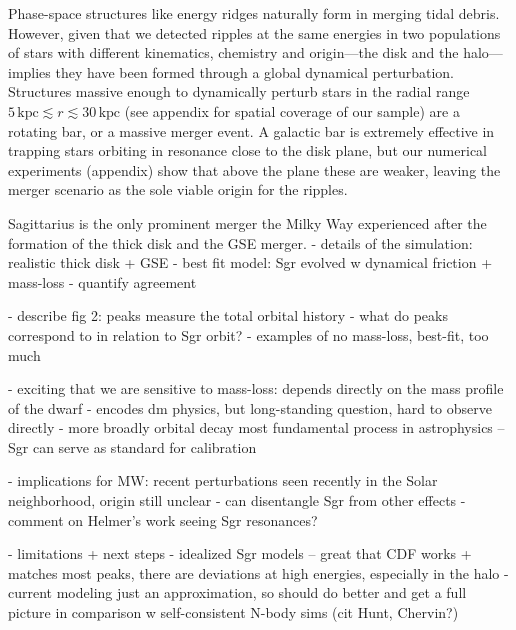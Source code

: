 \documentclass{natureprintstyle}
\newcommand{\kpc}{\ensuremath{\textrm{kpc}}}
\begin{document}
Phase-space structures like energy ridges naturally form in merging tidal debris\cite{gomez:2010, gomez:2012a, belokurov:2023}.
However, given that we detected ripples at the same energies in two populations of stars with different kinematics, chemistry and origin---the disk and the halo---implies they have been formed through a global dynamical perturbation.
Structures massive enough to dynamically perturb stars in the radial range $5\,\kpc\lesssim r \lesssim 30\,\kpc$ (see appendix for spatial coverage of our sample) are a rotating bar, or a massive merger event.
A galactic bar is extremely effective in trapping stars orbiting in resonance close to the disk plane\cite{dehnen:2000, trick:2021, dilamore:2023}, but our numerical experiments (appendix) show that above the plane these are weaker, leaving the merger scenario as the sole viable origin for the ripples.


Sagittarius is the only prominent merger the Milky Way experienced after the formation of the thick disk and the GSE merger\cite{ruiz-lara:2020, kruijssen:2020, bonaca:2020}.
- details of the simulation: realistic thick disk + GSE
- best fit model: Sgr evolved w dynamical friction + mass-loss
- quantify agreement

- describe fig 2: peaks measure the total orbital history
- what do peaks correspond to in relation to Sgr orbit?
- examples of no mass-loss, best-fit, too much

- exciting that we are sensitive to mass-loss: depends directly on the mass profile of the dwarf
- encodes dm physics, but long-standing question, hard to observe directly
- more broadly orbital decay most fundamental process in astrophysics -- Sgr can serve as standard for calibration

- implications for MW: recent perturbations seen recently in the Solar neighborhood, origin still unclear
- can disentangle Sgr from other effects
- comment on Helmer's work seeing Sgr resonances?

- limitations + next steps
- idealized Sgr models -- great that CDF works + matches most peaks, there are deviations at high energies, especially in the halo
- current modeling just an approximation, so should do better and get a full picture in comparison w self-consistent N-body sims (cit Hunt, Chervin?)
\end{document}
